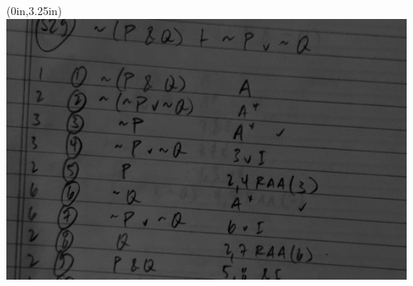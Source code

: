 
\thispagestyle{empty}

\begin{textblock*}{\stockwidth}(0in,3.25in)						%
  \noindent\includegraphics{../assets/proof-image-c.jpg}  %
\end{textblock*}

